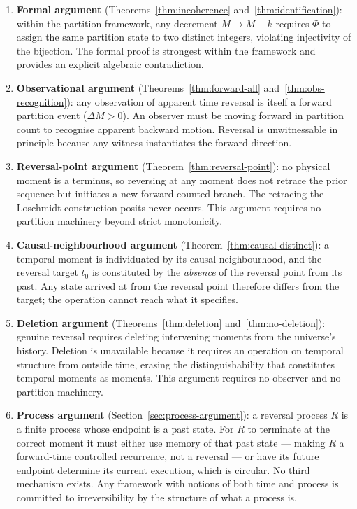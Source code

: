 \documentclass[twocolumn,10pt,a4paper]{article}
\theoremstyle{thmstyle}
\theoremstyle{definition}
\theoremstyle{remark}
\newcommand{\PhiMap}{\varPhi}
\begin{document}
\begin{enumerate}[leftmargin=1.5em,itemsep=0.2em]
\item \textbf{Formal argument} (Theorems~\ref{thm:incoherence} and~\ref{thm:identification}): within the partition framework, any decrement $M \to M - k$ requires $\PhiMap$ to assign the same partition state to two distinct integers, violating injectivity of the bijection. The formal proof is strongest within the framework and provides an explicit algebraic contradiction.

\item \textbf{Observational argument} (Theorems~\ref{thm:forward-all} and~\ref{thm:obs-recognition}): any observation of apparent time reversal is itself a forward partition event ($\Delta M > 0$). An observer must be moving forward in partition count to recognise apparent backward motion. Reversal is unwitnessable in principle because any witness instantiates the forward direction.

\item \textbf{Reversal-point argument} (Theorem~\ref{thm:reversal-point}): no physical moment is a terminus, so reversing at any moment does not retrace the prior sequence but initiates a new forward-counted branch. The retracing the Loschmidt construction posits never occurs. This argument requires no partition machinery beyond strict monotonicity.

\item \textbf{Causal-neighbourhood argument} (Theorem~\ref{thm:causal-distinct}): a temporal moment is individuated by its causal neighbourhood, and the reversal target $t_0$ is constituted by the \emph{absence} of the reversal point from its past. Any state arrived at from the reversal point therefore differs from the target; the operation cannot reach what it specifies.

\item \textbf{Deletion argument} (Theorems~\ref{thm:deletion} and~\ref{thm:no-deletion}): genuine reversal requires deleting intervening moments from the universe's history. Deletion is unavailable because it requires an operation on temporal structure from outside time, erasing the distinguishability that constitutes temporal moments as moments. This argument requires no observer and no partition machinery.

\item \textbf{Process argument} (Section~\ref{sec:process-argument}): a reversal process $R$ is a finite process whose endpoint is a past state. For $R$ to terminate at the correct moment it must either use memory of that past state --- making $R$ a forward-time controlled recurrence, not a reversal --- or have its future endpoint determine its current execution, which is circular. No third mechanism exists. Any framework with notions of both time and process is committed to irreversibility by the structure of what a process is.
\end{enumerate}
\end{document}
